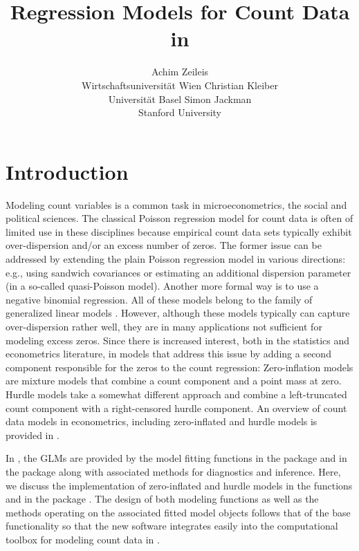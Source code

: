 \documentclass{Z}
\author{Achim Zeileis\\Wirtschaftsuniversit\"at Wien \And
        Christian Kleiber\\Universit\"at Basel \And
	Simon Jackman\\Stanford University}
\title{Regression Models for Count Data in \proglang{R}}
\newcommand{\fct}[1]{\code{#1()}}
\begin{document}


\section{Introduction} \label{sec:intro}

Modeling count variables is a common task in microeconometrics, the social
and political sciences. The classical Poisson regression model for count
data is often of limited use in these disciplines because empirical
count data sets typically exhibit over-dispersion and/or an excess
number of zeros. The former issue can be addressed by extending 
the plain Poisson regression model in various directions: e.g.,
using sandwich covariances or estimating an additional dispersion
parameter (in a so-called quasi-Poisson model). Another more formal
way is to use a negative binomial regression. All of these models
belong to the family of generalized linear models 
\citep[GLMs, see][]{countreg:Nelder+Wedderburn:1972,countreg:McCullagh+Nelder:1989}.
However, although these models typically can capture over-dispersion
rather well, they are in many applications not sufficient for 
modeling excess zeros. Since \cite{countreg:Lambert:1992} there is
increased interest, both in the statistics and econometrics literature,
in models that address this issue by adding a second component 
responsible for the zeros to the count regression: Zero-inflation models
are mixture models that combine a count component and a point mass at zero.
Hurdle models \citep{countreg:Mullahy:1986} take a somewhat different
approach and combine a left-truncated count component with a
right-censored hurdle component.
An overview of count data models in econometrics, including 
zero-inflated and hurdle models is provided in
\cite{countreg:Cameron+Trivedi:1998,countreg:Cameron+Trivedi:2005}.

In  \citep{countreg:R:2007}, the GLMs are provided
by the model fitting functions \fct{glm} \citep{countreg:Chambers+Hastie:1992}
in the  package and \fct{glm.nb} in the 
package \citep{countreg:Venables+Ripley:2002} along with associated
methods for diagnostics and inference. Here, we discuss the implementation
of zero-inflated and hurdle models in the functions \fct{zeroinfl}
and \fct{hurdle} in the  package \citep{countreg:Jackman:2007}.
The design of both modeling functions as well as the methods operating
on the associated fitted model objects follows that of the base 
functionality so that the new software integrates easily into the
computational toolbox for modeling count data in .
\end{document}
